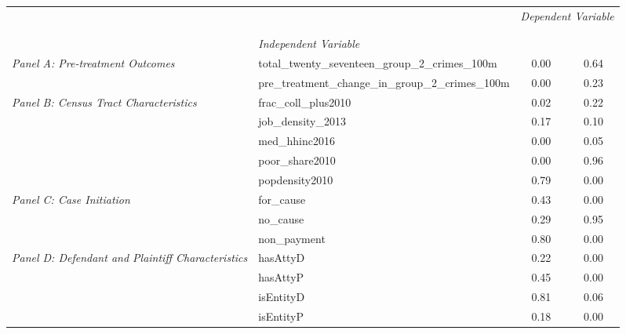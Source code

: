 \begin{tabular}{llcc}
\toprule
 &  & \multicolumn{2}{c}{\textit{Dependent Variable}} \\
\cline{3-4}
\\
 &  &  &  \\
 & \emph{Independent Variable} &  &  \\
\midrule
\multirow[c]{2}{3cm}{\textit{Panel A: Pre-treatment Outcomes}} & total_twenty_seventeen_group_2_crimes_100m & 0.00 & 0.64 \\
 & pre_treatment_change_in_group_2_crimes_100m & 0.00 & 0.23 \\
\cline{1-4}
\multirow[c]{5}{3cm}{\textit{Panel B: Census Tract Characteristics}} & frac_coll_plus2010 & 0.02 & 0.22 \\
 & job_density_2013 & 0.17 & 0.10 \\
 & med_hhinc2016 & 0.00 & 0.05 \\
 & poor_share2010 & 0.00 & 0.96 \\
 & popdensity2010 & 0.79 & 0.00 \\
\cline{1-4}
\multirow[c]{3}{3cm}{\textit{Panel C: Case Initiation}} & for_cause & 0.43 & 0.00 \\
 & no_cause & 0.29 & 0.95 \\
 & non_payment & 0.80 & 0.00 \\
\cline{1-4}
\multirow[c]{4}{3cm}{\textit{Panel D: Defendant and Plaintiff Characteristics}} & hasAttyD & 0.22 & 0.00 \\
 & hasAttyP & 0.45 & 0.00 \\
 & isEntityD & 0.81 & 0.06 \\
 & isEntityP & 0.18 & 0.00 \\
\cline{1-4}
\bottomrule
\end{tabular}
